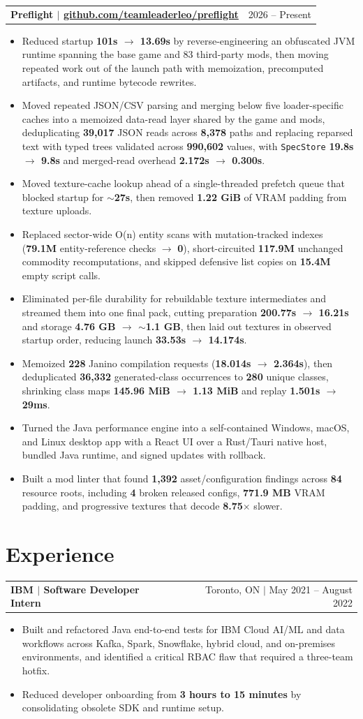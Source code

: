 \documentclass[letterpaper,11pt]{article}
\makeatletter
\newcommand{\resumeHeadingSimple}[2]{%
  \begin{tabularx}{\textwidth}{@{}Xr@{}}
    \textbf{#1} & #2
  \end{tabularx}\vspace{-1pt}
}
\newcommand{\resumeItemListStart}{\begin{itemize}[leftmargin=0.23in,itemsep=0.4pt,parsep=0pt,topsep=0.5pt]}
\newcommand{\resumeItem}[1]{\item\fontsize{9.9pt}{11.1pt}\selectfont #1}
\newcommand{\resumeItemListEnd}{\end{itemize}\vspace{-1.25pt}}
\makeatother
\begin{document}
\resumeHeadingSimple
  {Preflight $|$ \href{https://github.com/teamleaderleo/preflight}{github.com/teamleaderleo/preflight}}
  {2026 -- Present}
\resumeItemListStart
  \resumeItem{Reduced startup \textbf{101s $\rightarrow$ 13.69s} by reverse-engineering an obfuscated JVM runtime spanning the base game and 83 third-party mods, then moving repeated work out of the launch path with memoization, precomputed artifacts, and runtime bytecode rewrites.}
  \resumeItem{Moved repeated JSON/CSV parsing and merging below five loader-specific caches into a memoized data-read layer shared by the game and mods, deduplicating \textbf{39,017} JSON reads across \textbf{8,378} paths and replacing reparsed text with typed trees validated across \textbf{990,602} values, with \texttt{SpecStore} \textbf{19.8s $\rightarrow$ 9.8s} and merged-read overhead \textbf{2.172s $\rightarrow$ 0.300s}.}
  \resumeItem{Moved texture-cache lookup ahead of a single-threaded prefetch queue that blocked startup for \textbf{$\sim$27s}, then removed \textbf{1.22 GiB} of VRAM padding from texture uploads.}
  \resumeItem{Replaced sector-wide O(n) entity scans with mutation-tracked indexes (\textbf{79.1M} entity-reference checks $\rightarrow$ \textbf{0}), short-circuited \textbf{117.9M} unchanged commodity recomputations, and skipped defensive list copies on \textbf{15.4M} empty script calls.}
  \resumeItem{Eliminated per-file durability for rebuildable texture intermediates and streamed them into one final pack, cutting preparation \textbf{200.77s $\rightarrow$ 16.21s} and storage \textbf{4.76 GB $\rightarrow$ $\sim$1.1 GB}, then laid out textures in observed startup order, reducing launch \textbf{33.53s $\rightarrow$ 14.174s}.}
  \resumeItem{Memoized \textbf{228} Janino compilation requests (\textbf{18.014s $\rightarrow$ 2.364s}), then deduplicated \textbf{36,332} generated-class occurrences to \textbf{280} unique classes, shrinking class maps \textbf{145.96 MiB $\rightarrow$ 1.13 MiB} and replay \textbf{1.501s $\rightarrow$ 29ms}.}
  \resumeItem{Turned the Java performance engine into a self-contained Windows, macOS, and Linux desktop app with a React UI over a Rust/Tauri native host, bundled Java runtime, and signed updates with rollback.}
  \resumeItem{Built a mod linter that found \textbf{1,392} asset/configuration findings across \textbf{84} resource roots, including \textbf{4} broken released configs, \textbf{771.9 MB} VRAM padding, and progressive textures that decode \textbf{8.75$\times$} slower.}
\resumeItemListEnd

\section{Experience}
\resumeHeadingSimple
  {IBM $|$ Software Developer Intern}
  {Toronto, ON $|$ May 2021 -- August 2022}
\resumeItemListStart
  \resumeItem{Built and refactored Java end-to-end tests for IBM Cloud AI/ML and data workflows across Kafka, Spark, Snowflake, hybrid cloud, and on-premises environments, and identified a critical RBAC flaw that required a three-team hotfix.}
  \resumeItem{Reduced developer onboarding from \textbf{3 hours to 15 minutes} by consolidating obsolete SDK and runtime setup.}
\resumeItemListEnd
\end{document}
